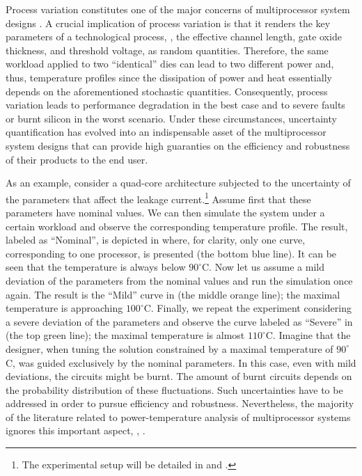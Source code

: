 Process variation constitutes one of the major concerns of multiprocessor system designs \cite{chandrakasan2001, srivastava2010}.
A crucial implication of process variation is that it renders the key parameters of a technological process, \eg, the effective channel length, gate oxide thickness, and threshold voltage, as random quantities.
Therefore, the same workload applied to two ``identical'' dies can lead to two different power and, thus, temperature profiles since the dissipation of power and heat essentially depends on the aforementioned stochastic quantities.
Consequently, process variation leads to performance degradation in the best case and to severe faults or burnt silicon in the worst scenario.
Under these circumstances, uncertainty quantification \cite{xiu2010, maitre2010} has evolved into an indispensable asset of the multiprocessor system designs that can provide high guaranties on the efficiency and robustness of their products to the end user.


As an example, consider a quad-core architecture subjected to the uncertainty of the parameters that affect the leakage current.\footnote{The experimental setup will be detailed in  and .}
Assume first that these parameters have nominal values. We can then simulate the system under a certain workload and observe the corresponding temperature profile.
The result, labeled as ``Nominal'', is depicted in  where, for clarity, only one curve, corresponding to one processor, is presented (the bottom blue line). It can be seen that the temperature is always below $90^{\circ}$C.
Now let us assume a mild deviation of the parameters from the nominal values and run the simulation once again. The result is the ``Mild'' curve in  (the middle orange line); the maximal temperature is approaching $100^{\circ}$C.
Finally, we repeat the experiment considering a severe deviation of the parameters and observe the curve labeled as ``Severe'' in  (the top green line); the maximal temperature is almost $110^{\circ}$C.
Imagine that the designer, when tuning the solution constrained by a maximal temperature of $90^\circ$C, was guided exclusively by the nominal parameters. In this case, even with mild deviations, the circuits might be burnt.
The amount of burnt circuits depends on the probability distribution of these fluctuations.
Such uncertainties have to be addressed in order to pursue efficiency and robustness.
Nevertheless, the majority of the literature related to power-temperature analysis of multiprocessor systems ignores this important aspect, \eg, \cite{rao2009, rai2011, thiele2011, ukhov2012}.

